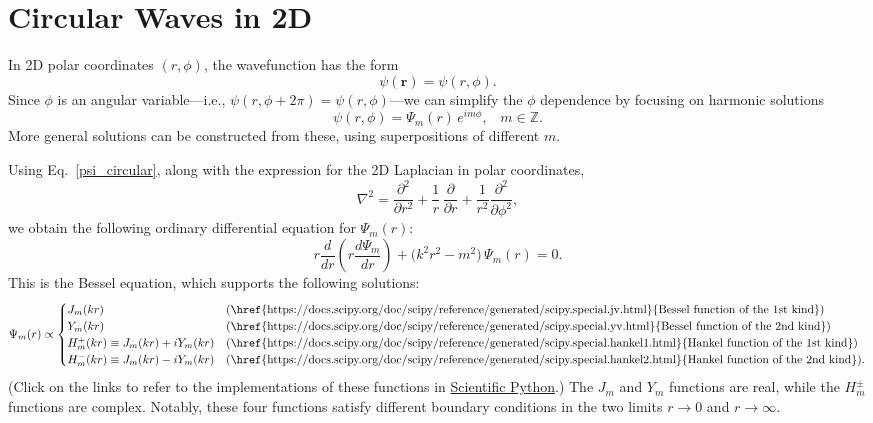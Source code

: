 \documentclass[pra,12pt]{revtex4}
\begin{document}
\section{Circular Waves in 2D}

In 2D polar coordinates $(r, \phi)$, the wavefunction has the form
\begin{equation}
  \psi(\mathbf{r}) = \psi(r,\phi).
\end{equation}
Since $\phi$ is an angular variable---i.e., $\psi(r,\phi + 2\pi) =
\psi(r, \phi)$---we can simplify the $\phi$ dependence by focusing on
harmonic solutions
\begin{equation}
  \psi(r,\phi) = \Psi_m(r)\, e^{im\phi}, \;\;\;m \in\mathbb{Z}.
  \label{psi_circular}
\end{equation}
More general solutions can be constructed from these, using
superpositions of different $m$.

Using Eq.~\eqref{psi_circular}, along with the expression for the 2D
Laplacian in polar coordinates,
\begin{equation}
  \nabla^2 = \frac{\partial^2}{\partial r^2} + \frac{1}{r} \,
  \frac{\partial}{\partial r} +
  \frac{1}{r^2}\frac{\partial^2}{\partial\phi^2},
\end{equation}
we obtain the following ordinary differential equation for $\Psi_m(r)$:
\begin{equation}
  r \frac{d}{dr}\!\left(r \frac{d\Psi_m}{dr} \right)
  + \Big(k^2 r^2 - m^2 \Big)\, \Psi_m(r) = 0.
  \label{besseleq}
\end{equation}
This is the Bessel equation, which supports the following solutions:
\begin{equation}
  \Psi_m(r) \propto \begin{cases}
    J_m(kr) &\text{(\href{https://docs.scipy.org/doc/scipy/reference/generated/scipy.special.jv.html}{Bessel function of the 1st kind})} \\
    Y_m(kr) &\text{(\href{https://docs.scipy.org/doc/scipy/reference/generated/scipy.special.yv.html}{Bessel function of the 2nd kind})} \\
    H_m^+(kr) \equiv J_m(kr) + i Y_m(kr) &\text{(\href{https://docs.scipy.org/doc/scipy/reference/generated/scipy.special.hankel1.html}{Hankel function of the 1st kind})} \\
    H_m^-(kr) \equiv J_m(kr) - i Y_m(kr) &\text{(\href{https://docs.scipy.org/doc/scipy/reference/generated/scipy.special.hankel2.html}{Hankel function of the 2nd kind})}.
  \end{cases}
\end{equation}
(Click on the links to refer to the implementations of these functions
in \href{https://scipy.org/}{Scientific Python}.)  The $J_m$ and $Y_m$
functions are real, while the $H_m^\pm$ functions are complex.
Notably, these four functions satisfy different boundary conditions in
the two limits $r\rightarrow 0$ and $r \rightarrow \infty$.
\end{document}
